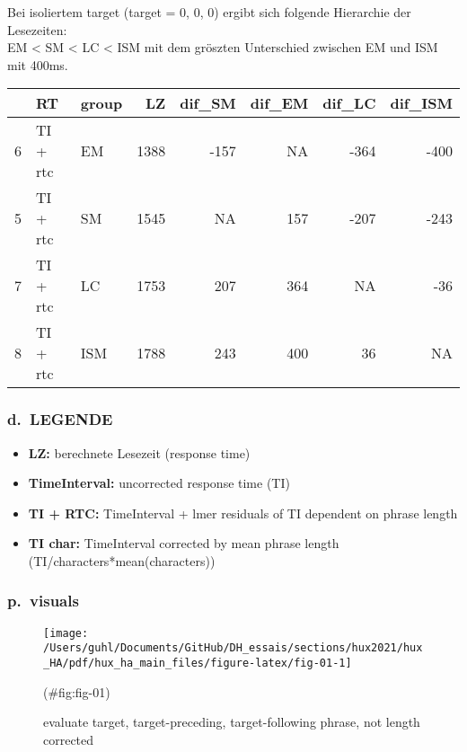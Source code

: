 \documentclass[
]{article}
\providecommand{\tightlist}{%
  \setlength{\itemsep}{0pt}\setlength{\parskip}{0pt}}
\begin{document}
Bei isoliertem target (target = 0, 0, 0) ergibt sich folgende Hierarchie der Lesezeiten:\\
EM \textless{} SM \textless{} LC \textless{} ISM mit dem gröszten Unterschied zwischen EM und ISM mit 400ms.

\begin{tabular}{l|l|l|r|r|r|r|r}
\hline
  & RT & group & LZ & dif\_SM & dif\_EM & dif\_LC & dif\_ISM\\
\hline
6 & TI + rtc & EM & 1388 & -157 & NA & -364 & -400\\
\hline
5 & TI + rtc & SM & 1545 & NA & 157 & -207 & -243\\
\hline
7 & TI + rtc & LC & 1753 & 207 & 364 & NA & -36\\
\hline
8 & TI + rtc & ISM & 1788 & 243 & 400 & 36 & NA\\
\hline
\end{tabular}

\hypertarget{d.-legende}{%
\subsubsection{d.~LEGENDE}\label{d.-legende}}

\begin{itemize}
\tightlist
\item
  \textbf{LZ:} berechnete Lesezeit (response time)
\item
  \textbf{TimeInterval:} uncorrected response time (TI)\\
\item
  \textbf{TI + RTC:} TimeInterval + lmer residuals of TI dependent on phrase length\\
\item
  \textbf{TI char:} TimeInterval corrected by mean phrase length (TI/characters*mean(characters))
\end{itemize}

\hypertarget{p.-visuals}{%
\subsubsection{p.~visuals}\label{p.-visuals}}

\begin{figure}[htpb]
\texttt{[image: /Users/guhl/Documents/GitHub/DH\_essais/sections/hux2021/hux\_HA/pdf/hux\_ha\_main\_files/figure-latex/fig-01-1]} \caption{evaluate target, target-preceding, target-following phrase, not length corrected}(\#fig:fig-01)
\end{figure}
\end{document}

